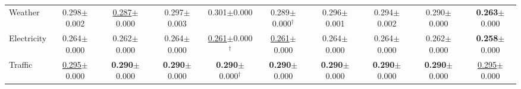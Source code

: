 \begin{table}[t]
{\begin{tabular}{l|ccccccccc}
Weather & 0.298{\scriptsize$\pm$0.002} & \underline{0.287}{\scriptsize$\pm$0.000} & 0.297{\scriptsize$\pm$0.003} & 0.301{\scriptsize$\pm$0.000} & 0.289{\scriptsize$\pm$0.000}$^\dagger$ & 0.296{\scriptsize$\pm$0.001} & 0.294{\scriptsize$\pm$0.002} & 0.290{\scriptsize$\pm$0.000} & \textbf{0.263}{\scriptsize$\pm$0.000} \\
Electricity & 0.264{\scriptsize$\pm$0.000} & 0.262{\scriptsize$\pm$0.000} & 0.264{\scriptsize$\pm$0.000} & \underline{0.261}{\scriptsize$\pm$0.000}$^\dagger$ & \underline{0.261}{\scriptsize$\pm$0.000} & 0.264{\scriptsize$\pm$0.000} & 0.264{\scriptsize$\pm$0.000} & 0.262{\scriptsize$\pm$0.000} & \textbf{0.258}{\scriptsize$\pm$0.000} \\
Traffic & \underline{0.295}{\scriptsize$\pm$0.000} & \textbf{0.290}{\scriptsize$\pm$0.000} & \textbf{0.290}{\scriptsize$\pm$0.000} & \textbf{0.290}{\scriptsize$\pm$0.000}$^\dagger$ & \textbf{0.290}{\scriptsize$\pm$0.000} & \textbf{0.290}{\scriptsize$\pm$0.000} & \textbf{0.290}{\scriptsize$\pm$0.000} & \textbf{0.290}{\scriptsize$\pm$0.000} & \underline{0.295}{\scriptsize$\pm$0.000} \\
\bottomrule
\end{tabular}
}
\end{table}
